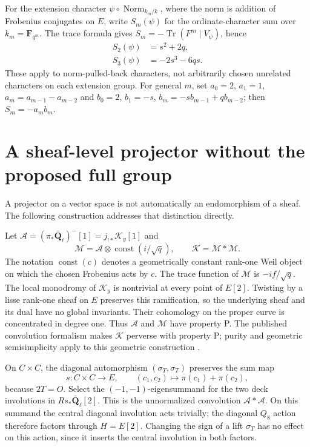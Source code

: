 \documentclass[11pt,a4paper]{article}
\numberwithin{equation}{section}
\newcommand{\F}{\mathbf F}
\newcommand{\Q}{\overline{\mathbf Q}_{\ell}}
\newcommand{\Tr}{\operatorname{Tr}}
\newcommand{\const}{\operatorname{const}}
\newcommand{\A}{\mathcal A}
\newcommand{\M}{\mathcal M}
\begin{document}
For the extension character $\psi\circ\operatorname{Norm}_{k_m/k}$, where the norm is addition of Frobenius conjugates on $E$, write $S_m(\psi)$ for the ordinate-character sum over $k_m=\F_{q^m}$. The trace formula gives $S_m=-\Tr(F^m\mid V_\psi)$, hence
\begin{align}\label{eq:extension}
 S_2(\psi)&=s^2+2q,\\
 S_3(\psi)&=-2s^3-6qs.\label{eq:extension3}
\end{align}
These apply to norm-pulled-back characters, not arbitrarily chosen unrelated characters on each extension group. For general $m$, set $a_0=2$, $a_1=1$, $a_m=a_{m-1}-a_{m-2}$ and $b_0=2$, $b_1=-s$, $b_m=-sb_{m-1}+qb_{m-2}$; then $S_m=-a_mb_m$.

\section{A sheaf-level projector without the proposed full group}
A projector on a vector space is not automatically an endomorphism of a sheaf. The following construction addresses that distinction directly.

Let $\A=(\pi_*\Q)^-[1]=j_{!*}\mathcal K_y[1]$ and
\begin{equation}
 \M=\A\otimes\const(i/\sqrt q),\qquad \mathcal K=\M*\M.
\end{equation}
The notation $\const(c)$ denotes a geometrically constant rank-one Weil object on which the chosen Frobenius acts by $c$. The trace function of $\M$ is $-if/\sqrt q$. The local monodromy of $\mathcal K_y$ is nontrivial at every point of $E[2]$. Twisting by a lisse rank-one sheaf on $E$ preserves this ramification, so the underlying sheaf and its dual have no global invariants. Their cohomology on the proper curve is concentrated in degree one. Thus $\A$ and $\M$ have property P. The published convolution formalism makes $\mathcal K$ perverse with property P; purity and geometric semisimplicity apply to this geometric construction \cite{Katz,CDRS,Deligne}.

On $C\times C$, the diagonal automorphism $(\sigma_T,\sigma_T)$ preserves the sum map
\begin{equation}
 s:C\times C\longrightarrow E,\qquad(c_1,c_2)\longmapsto\pi(c_1)+\pi(c_2),
\end{equation}
because $2T=O$. Select the $(-1,-1)$-eigensummand for the two deck involutions in $Rs_*\Q[2]$. This is the unnormalized convolution $\A*\A$. On this summand the central diagonal involution acts trivially; the diagonal $Q_8$ action therefore factors through $H=E[2]$. Changing the sign of a lift $\sigma_T$ has no effect on this action, since it inserts the central involution in both factors.
\end{document}
